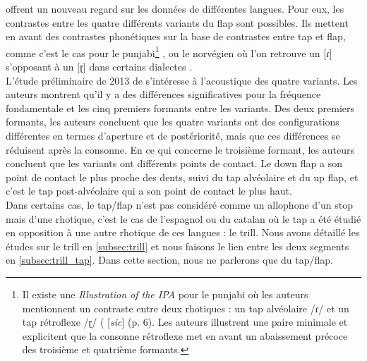 \textcite{derrickIndividualVariationEnglish2011} offrent un nouveau regard sur les données de différentes langues. Pour eux, les contrastes entre les quatre différents variants du flap sont possibles. Ils mettent en avant des contrastes phonétiques sur la base de contrastes entre tap et flap, comme c'est le cas pour le punjabi\footnote{Il existe une \textit{Illustration of the IPA} pour le punjabi \parencite{hussainPunjabiLyallpuriVariety2019} où les auteurs mentionnent un contraste entre deux rhotiques : un tap alvéolaire /ɾ/ et un tap rétroflexe /ɽ/ ( [\textit{sic}] (p. 6). Les auteurs illustrent une paire minimale et explicitent que la consonne rétroflexe met en avant un abaissement précoce des troisième et quatrième formants.} \parencite[645]{shacklePanjabi2003}, ou le norvégien où l'on retrouve un [ɾ] s'opposant à un [ɽ] dans certains dialectes \parencite[24]{kristoffersenPhonologyNorwegian2000}.\\

L'étude préliminaire de 2013 de \citeauthor{derrickAcousticCorrelatesFlaps2013} s'intéresse à l'acoustique des quatre variants. Les auteurs montrent qu'il y a des différences significatives pour la fréquence fondamentale et les cinq premiers formants entre les variants. Des deux premiers formants, les auteurs concluent que les quatre variants ont des configurations différentes en termes d'aperture et de postériorité, mais que ces différences se réduisent après la consonne. En ce qui concerne le troisième formant, les auteurs concluent que les variants ont différents points de contact. Le down flap a son point de contact le plus proche des dents, suivi du tap alvéolaire et du up flap, et c'est le tap post-alvéolaire qui a son point de contact le plus haut.\\

Dans certains cas, le tap/flap n'est pas considéré comme un allophone d'un stop mais d'une rhotique, c'est le cas de l'espagnol ou du catalan où le tap a été étudié en opposition à une autre rhotique de ces langues : le trill. Nous avons détaillé les études sur le trill en \autoref{subsec:trill} et nous faisons le lien entre les deux segments en \autoref{subsec:trill_tap}. Dans cette section, nous ne parlerons que du tap/flap.

